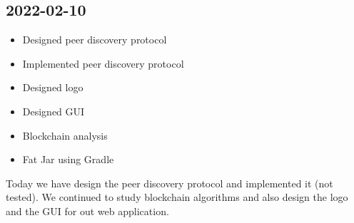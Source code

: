 \documentclass{article}
\begin{document}
\subsection*{2022-02-10}

\begin{itemize}
    \item Designed peer discovery protocol
    \item Implemented peer discovery protocol
    \item Designed logo
    \item Designed GUI
    \item Blockchain analysis
    \item Fat Jar using Gradle
\end{itemize}

Today we have design the peer discovery protocol and implemented it (not tested).
We continued to study blockchain algorithms and also design the logo and the GUI for out web application.
\end{document}
